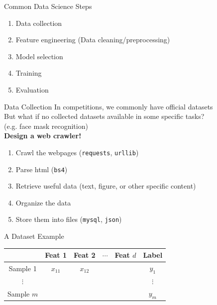 \documentclass{../TexTemplate/myslide}
\begin{document}
\begin{frame}{Common Data Science Steps}
\begin{enumerate}
	\item Data collection
	\item Feature engineering (Data cleaning/preprocessing)
	\item Model selection
	\item Training
	\item Evaluation
\end{enumerate}
\end{frame}

\begin{frame}[fragile]{Data Collection}
In competitions, we commonly have official datasets\\
But what if no collected datasets available in some specific tasks?\\
(e.g. face mask recognition)\\
\pause
\textbf{Design a web crawler!}
\begin{enumerate}
	\item Crawl the webpages (\verb'requests', \verb'urllib')
	\item Parse html (\verb'bs4')
	\item Retrieve useful data (text, figure, or other specific content)
	\item Organize the data
	\item Store them into files (\verb'mysql', \verb'json')
\end{enumerate}
\end{frame}

\begin{frame}{A Dataset Example}
\begin{center}
\begin{tabular}{cccccc}\hline
 & Feat 1 & Feat 2 & $\cdots$ & Feat $d$ & Label\\\hline
Sample 1 & $x_{11}$ & $x_{12}$ & & & $y_1$ \\\hline
$\vdots$ & & & & & $\vdots$\\\hline
Sample $m$ & & & & & $y_m$ \\\hline
\end{tabular}
\end{center}
\end{frame}
\end{document}
